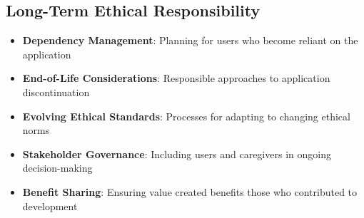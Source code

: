 \subsection{Long-Term Ethical Responsibility}
\begin{itemize}
    \item \textbf{Dependency Management}: Planning for users who become reliant on the application
    
    \item \textbf{End-of-Life Considerations}: Responsible approaches to application discontinuation
    
    \item \textbf{Evolving Ethical Standards}: Processes for adapting to changing ethical norms
    
    \item \textbf{Stakeholder Governance}: Including users and caregivers in ongoing decision-making
    
    \item \textbf{Benefit Sharing}: Ensuring value created benefits those who contributed to development
\end{itemize}